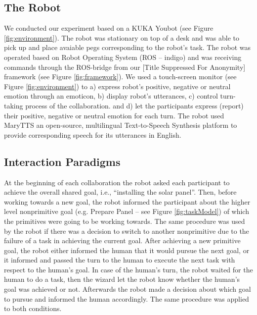 \documentclass{sig-alternate-05-2015}
\begin{document}
\subsection{The Robot}

We conducted our experiment based on a KUKA Youbot (see Figure
\ref{fig:environment}). The robot was stationary on top of a desk and was able
to pick up and place avaiable pegs corresponding to the robot's task. The robot
was operated based on Robot Operating System (ROS -- indigo) and was receiving
commands through the ROS-bridge from our [Title Suppressed For Anonymity]
framework (see Figure \ref{fig:framework}). We used a touch-screen monitor (see
Figure \ref{fig:environment}) to a) express robot's positive, negative or
neutral emotion through an emoticon, b) display robot's utterances, c)
control turn-taking process of the collaboration. and d) let the participants
express (report) their positive, negative or neutral emotion for each turn. The
robot used MaryTTS an open-source, multilingual Text-to-Speech Synthesis
platform to provide corresponding speech for its utterances in English.

\vspace*{-2mm}
\subsection{Interaction Paradigms}
\label{sec-interaction-paradigms}
At the beginning of each collaboration the robot asked each participant to
achieve the overall shared goal, i.e., ``installing the solar panel''. Then,
before working towards a new goal, the robot informed the participant about the
higher level nonprimitive goal (e.g. Prepare Panel -- see Figure
\ref{fig:taskModel}) of which the primitives were going to be working towards.
The same procedure was used by the robot if there was a decision to switch to
another nonprimitive due to the failure of a task in achieving the current goal.
After achieving a new primitive goal, the robot either informed the human that
it would pursue the next goal, or it informed and passed the turn to the human
to execute the next task with respect to the human's goal. In case of the
human's turn, the robot waited for the human to do a task, then the wizard let
the robot know whether the human's goal was achieved or not. Afterwards the
robot made a decision about which goal to pursue and informed the human
accordingly. The same procedure was applied to both conditions.
\end{document}
